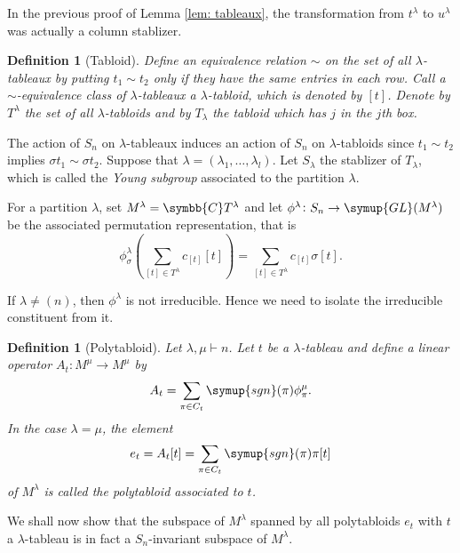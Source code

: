 \documentclass{assignment}[2019/10/15]
\newcommand{\lr}[3]{\left#1#3\right#2}
\theoremstyle{plain}
\newtheorem{definition}[theorem]{Definition}
\newcommand{\BC}{\symbb{C}}
\newcommand{\GL}{\mathop{}\!\symup{GL}}
\newcommand{\sgn}{\mathop{}\!\symup{sgn}}
\begin{document}
    In the previous proof of Lemma \ref{lem: tableaux}, the transformation from $t^\lambda$ to $u^\lambda$ was actually a column stablizer.

    \begin{definition}[Tabloid]
        Define an equivalence relation $\sim$ on the set of all $\lambda$-tableaux by putting $t_1\sim t_2$ only if they have the same entries in each row. Call a $\sim$-equivalence class of $\lambda$-tableaux a $\lambda$-\emph{tabloid}, which is denoted by $[t]$. Denote by $T^\lambda$ the set of all $\lambda$-tabloids and by $T_\lambda$ the tabloid which has $j$ in the $j$th box.
    \end{definition}

    The action of $S_n$ on $\lambda$-tableaux induces an action of $S_n$ on $\lambda$-tabloids since $t_1\sim t_2$ implies $\sigma t_1\sim \sigma t_2$. Suppose that $\lambda = (\lambda_1, \dotsc, \lambda_l)$. Let $S_\lambda$ the stablizer of $T_\lambda$, which is called the \emph{Young subgroup} associated to the partition $\lambda$.

    For a partition $\lambda$, set $M^\lambda = \BC T^\lambda$ and let $\phi^\lambda\colon S_n\to \GL(M^\lambda)$ be the associated permutation representation, that is
    \begin{equation}
        \phi_\sigma^\lambda\lr(){\sum_{[t]\in T^\lambda}c_{[t]}[t]} = \sum_{[t]\in T^\lambda}c_{[t]}\sigma[t].
    \end{equation}

    If $\lambda\neq (n)$, then $\phi^\lambda$ is not irreducible. Hence we need to isolate the irreducible constituent from it.

    \begin{definition}[Polytabloid]
        Let $\lambda, \mu\vdash n$. Let $t$ be a $\lambda$-tableau and define a linear operator $A_t\colon M^\mu\to M^\mu$ by
        \begin{equation}
            A_t = \sum_{\pi\in C_t}\sgn(\pi)\phi^\mu_\pi.
        \end{equation}
        In the case $\lambda=\mu$, the element
        \begin{equation}
            e_t = A_t[t] = \sum_{\pi\in C_t}\sgn(\pi)\pi[t]
        \end{equation}
        of $M^\lambda$ is called the polytabloid associated to $t$.
    \end{definition}

    We shall now show that the subspace of $M^\lambda$ spanned by all polytabloids $e_t$ with $t$ a $\lambda$-tableau is in fact a $S_n$-invariant subspace of $M^\lambda$.
\end{document}
